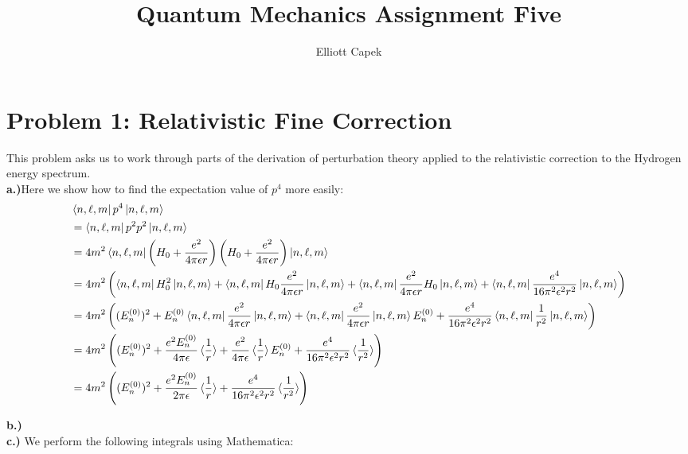 \documentclass[10pt]{article} %
\title{Quantum Mechanics Assignment Five}
\author{Elliott Capek}
\begin{document}
\maketitle{}

\section{Problem 1: Relativistic Fine Correction}

This problem asks us to work through parts of the derivation of perturbation theory applied to
the relativistic correction to the Hydrogen energy spectrum.\\

\textbf{a.)}Here we show how to find the expectation value of $p^4$ more easily:\\

\begin{align*}
  &\bra{n,\ell,m}p^4\ket{n,\ell,m}\\
  &= \bra{n,\ell,m}p^2p^2\ket{n,\ell,m}\\
  &= 4m^2\bra{n,\ell,m}\left(H_0 + \frac{e^2}{4\pi\epsilon r}\right)
  \left(H_0 + \frac{e^2}{4\pi\epsilon r}\right)\ket{n,\ell,m}\\
  &= 4m^2\left(\bra{n,\ell,m}H_0^2\ket{n,\ell,m}
  + \bra{n,\ell,m}H_0\frac{e^2}{4\pi\epsilon r}\ket{n,\ell,m}
  + \bra{n,\ell,m}\frac{e^2}{4\pi\epsilon r}H_0\ket{n,\ell,m}
  + \bra{n,\ell,m}\frac{e^4}{16\pi^2\epsilon^2r^2}\ket{n,\ell,m}\right)\\
  &= 4m^2\left((E_n^{(0)})^2
  + E_n^{(0)}\bra{n,\ell,m}\frac{e^2}{4\pi\epsilon r}\ket{n,\ell,m}
  + \bra{n,\ell,m}\frac{e^2}{4\pi\epsilon r}\ket{n,\ell,m}E_n^{(0)}
  + \frac{e^4}{16\pi^2\epsilon^2r^2}\bra{n,\ell,m}\frac{1}{r^2}\ket{n,\ell,m}\right)\\
  &= 4m^2\left((E_n^{(0)})^2
  + \frac{e^2E_n^{(0)}}{4\pi\epsilon}\braket{\frac{1}{r}}
  + \frac{e^2}{4\pi\epsilon}\braket{\frac{1}{r}}E_n^{(0)}
  + \frac{e^4}{16\pi^2\epsilon^2r^2}\braket{\frac{1}{r^2}}\right)\\
  &= 4m^2\left((E_n^{(0)})^2
  + \frac{e^2E_n^{(0)}}{2\pi\epsilon}\braket{\frac{1}{r}}
  + \frac{e^4}{16\pi^2\epsilon^2r^2}\braket{\frac{1}{r^2}}\right)\\
\end{align*}

\textbf{b.)}\\

\textbf{c.)} We perform the following integrals using Mathematica:
\end{document}
